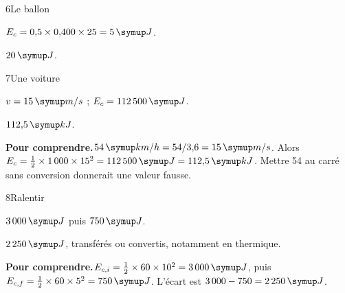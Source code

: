 \par\noindent\begin{minipage}{\linewidth}
\begin{corrige}{6}{Le ballon}
\begin{questions}
\item $E_c=0{,}5\times0{,}400\times25=5\unite J$.
\item $20\unite J$.
\end{questions}
\end{corrige}
\end{minipage}
\par\noindent\begin{minipage}{\linewidth}
\begin{corrige}{7}{Une voiture}
\begin{questions}
\item $v=15\unite{m/s}$ ; $E_c=112\,500\unite J$.
\item $112{,}5\unite{kJ}$.
\end{questions}
\par\smallskip\noindent\textbf{Pour comprendre.}\enspace $54\unite{km/h}=54/3{,}6=15\unite{m/s}$. Alors $E_c=\frac12\times1\,000\times15^2=112\,500\unite J=112{,}5\unite{kJ}$. Mettre 54 au carré sans conversion donnerait une valeur fausse.\par
\end{corrige}
\end{minipage}
\par\noindent\begin{minipage}{\linewidth}
\begin{corrige}{8}{Ralentir}
\begin{questions}
\item $3\,000\unite J$ puis $750\unite J$.
\item $2\,250\unite J$, transférés ou convertis, notamment en thermique.
\end{questions}
\par\smallskip\noindent\textbf{Pour comprendre.}\enspace $E_{c,i}=\frac12\times60\times10^2=3\,000\unite J$, puis $E_{c,f}=\frac12\times60\times5^2=750\unite J$. L’écart est $3\,000-750=2\,250\unite J$.\par
{}
\end{corrige}
\end{minipage}
